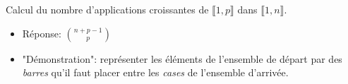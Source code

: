 Calcul du nombre d'applications croissantes de $\llbracket 1, p \rrbracket$ dans $\llbracket 1, n \rrbracket$.

\begin{itemize}
    \item Réponse: $\displaystyle \binom{n + p - 1}{p}$
    \item "Démonstration": représenter les éléments de l'ensemble de départ par des \emph{barres} qu'il faut placer entre les \emph{cases} de l'ensemble d'arrivée. 
\end{itemize}